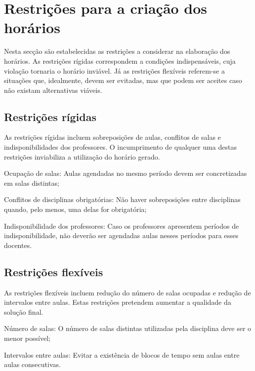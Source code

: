 \section{Restrições para a criação dos horários}
\label{capitulo3:Restricoes}

Nesta secção são estabelecidas as restrições a considerar na elaboração dos horários. As restrições rígidas correspondem a condições indispensáveis, cuja violação tornaria o horário inviável. Já as restrições flexíveis referem-se a situações que, idealmente, devem ser evitadas, mas que podem ser aceites caso não existam alternativas viáveis.

\subsection{Restrições rígidas}

As restrições rígidas incluem sobreposições de aulas, conflitos de salas e indisponibilidades dos professores. O incumprimento de qualquer uma destas restrições inviabiliza a utilização do horário gerado.

\begin{compactenum}
    \item Ocupação de salas: Aulas agendadas no mesmo período devem ser concretizadas em salas distintas;
    \item Conflitos de disciplinas obrigatórias: Não haver sobreposições entre disciplinas quando, pelo menos, uma delas for obrigatória;
    \item Indisponibilidade dos professores: Caso os professores apresentem períodos de indisponibilidade, não deverão ser agendadas aulas nesses períodos para esses docentes.
\end{compactenum}

\subsection{Restrições flexíveis}

As restrições flexíveis incluem redução do número de salas ocupadas e redução de intervalos entre aulas. Estas restrições pretendem aumentar a qualidade da solução final.

\begin{compactenum}
    \item Número de salas: O número de salas distintas utilizadas pela disciplina deve ser o menor possível;
    \item Intervalos entre aulas: Evitar a existência de blocos de tempo sem aulas entre aulas consecutivas.
\end{compactenum}

